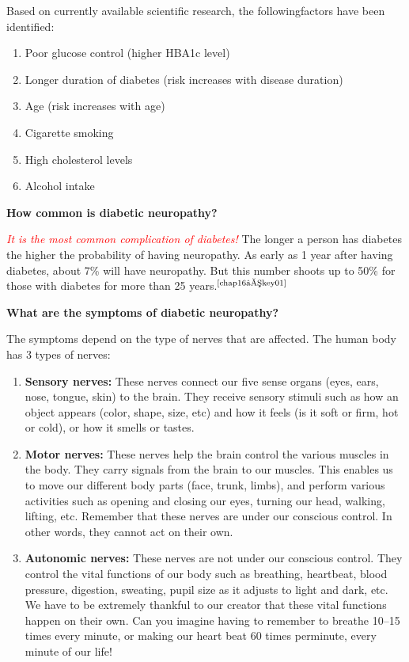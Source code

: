 Based on currently available scientific research, the following\break factors have been identified:

\begin{enumerate}[•]
\itemsep=0pt
\item Poor glucose control (higher HBA1c level)
\item Longer duration of diabetes (risk increases with disease duration)
\item Age (risk increases with age)
\item Cigarette smoking
\item High cholesterol levels
\item Alcohol intake
\end{enumerate}

\noindent\textbf{How common is diabetic neuropathy?}

\textcolor{red}{\textit{It is the most common complication of diabetes!}} The longer a person has diabetes the higher the probability of having neuropathy. As early as 1 year after having diabetes, about 7\% will have neuropathy. But this number shoots up to 50\% for those with diabetes for more than 25 years.$^{\text{\cite{chap16–key01}}}$

\noindent\textbf{What are the symptoms of diabetic neuropathy?}

The symptoms depend on the type of nerves that are affected. The human body has 3 types of nerves:

\begin{enumerate}
\itemsep=0pt
\item \textbf{Sensory nerves:} These nerves connect our five sense organs (eyes, ears, nose, tongue, skin) to the brain. They receive sensory stimuli such as how an object appears (color, shape, size, etc) and how it feels (is it soft or firm, hot or cold), or how it smells or tastes.
\item \textbf{Motor nerves:} These nerves help the brain control the various muscles in the body. They carry signals from the brain to our muscles. This enables us to move our different body parts (face, trunk, limbs), and perform various activities such as opening and closing our eyes, turning our head, walking, lifting, etc. Reme\-mber that these nerves are under our conscious control. In other words, they cannot act on their own.
\item \textbf{Autonomic nerves:} These nerves are not under our conscious control. They control the vital functions of our body such as breathing, heartbeat, blood pressure, digestion, sweating, pupil size as it adjusts to light and dark, etc. We have to be extremely thankful to our creator that these vital functions happen on their own. Can you imagine having to remember to breathe 10–15 times every minute, or making our heart beat 60 times per\break minute, every minute of our life!
\end{enumerate}

